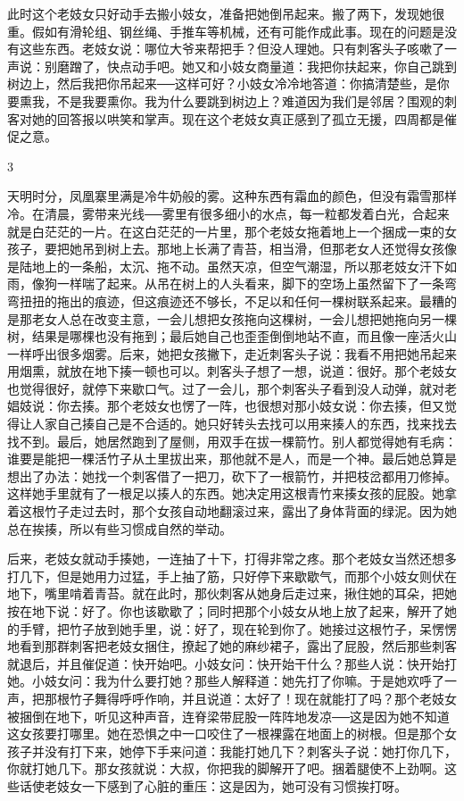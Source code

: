 此时这个老妓女只好动手去搬小妓女，准备把她倒吊起来。搬了两下，发现她很重。假如有滑轮组、钢丝绳、手推车等机械，还有可能作成此事。现在的问题是没有这些东西。老妓女说：哪位大爷来帮把手？但没人理她。只有刺客头子咳嗽了一声说：别磨蹭了，快点动手吧。她又和小妓女商量道：我把你扶起来，你自己跳到树边上，然后我把你吊起来──这样可好？小妓女冷冷地答道：你搞清楚些，是你要熏我，不是我要熏你。我为什么要跳到树边上？难道因为我们是邻居？围观的刺客对她的回答报以哄笑和掌声。现在这个老妓女真正感到了孤立无援，四周都是催促之意。 

3 

天明时分，凤凰寨里满是冷牛奶般的雾。这种东西有霜血的颜色，但没有霜雪那样冷。在清晨，雾带来光线──雾里有很多细小的水点，每一粒都发着白光，合起来就是白茫茫的一片。在这白茫茫的一片里，那个老妓女拖着地上一个捆成一束的女孩子，要把她吊到树上去。那地上长满了青苔，相当滑，但那老女人还觉得女孩像是陆地上的一条船，太沉、拖不动。虽然天凉，但空气潮湿，所以那老妓女汗下如雨，像狗一样喘了起来。从吊在树上的人头看来，脚下的空场上虽然留下了一条弯弯扭扭的拖出的痕迹，但这痕迹还不够长，不足以和任何一棵树联系起来。最糟的是那老女人总在改变主意，一会儿想把女孩拖向这棵树，一会儿想把她拖向另一棵树，结果是哪棵也没有拖到；最后她自己也歪歪倒倒地站不直，而且像一座活火山一样呼出很多烟雾。后来，她把女孩撇下，走近刺客头子说：我看不用把她吊起来用烟熏，就放在地下揍一顿也可以。刺客头子想了一想，说道：很好。那个老妓女也觉得很好，就停下来歇口气。过了一会儿，那个刺客头子看到没人动弹，就对老娼妓说：你去揍。那个老妓女也愣了一阵，也很想对那小妓女说：你去揍，但又觉得让人家自己揍自己是不合适的。她只好转头去找可以用来揍人的东西，找来找去找不到。最后，她居然跑到了屋侧，用双手在拔一棵箭竹。别人都觉得她有毛病：谁要是能把一棵活竹子从土里拔出来，那他就不是人，而是一个神。最后她总算是想出了办法：她找一个刺客借了一把刀，砍下了一根箭竹，并把枝岔都用刀修掉。这样她手里就有了一根足以揍人的东西。她决定用这根青竹来揍女孩的屁股。她拿着这根竹子走过去时，那个女孩自动地翻滚过来，露出了身体背面的绿泥。因为她总在挨揍，所以有些习惯成自然的举动。 

后来，老妓女就动手揍她，一连抽了十下，打得非常之疼。那个老妓女当然还想多打几下，但是她用力过猛，手上抽了筋，只好停下来歇歇气，而那个小妓女则伏在地下，嘴里啃着青苔。就在此时，那伙刺客从她身后走过来，揪住她的耳朵，把她按在地下说：好了。你也该歇歇了；同时把那个小妓女从地上放了起来，解开了她的手臂，把竹子放到她手里，说：好了，现在轮到你了。她接过这根竹子，呆愣愣地看到那群刺客把老妓女捆住，撩起了她的麻纱裙子，露出了屁股，然后那些刺客就退后，并且催促道：快开始吧。小妓女问：快开始干什么？那些人说：快开始打她。小妓女问：我为什么要打她？那些人解释道：她先打了你嘛。于是她欢呼了一声，把那根竹子舞得呼呼作响，并且说道：太好了！现在就能打了吗？那个老妓女被捆倒在地下，听见这种声音，连脊梁带屁股一阵阵地发凉──这是因为她不知道这女孩要打哪里。她在恐惧之中一口咬住了一根裸露在地面上的树根。但是那个女孩子并没有打下来，她停下手来问道：我能打她几下？刺客头子说：她打你几下，你就打她几下。那女孩就说：大叔，你把我的脚解开了吧。捆着腿使不上劲啊。这些话使老妓女一下感到了心脏的重压：这是因为，她可没有习惯挨打呀。 

